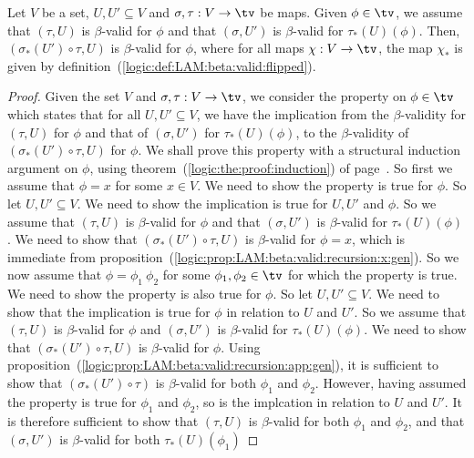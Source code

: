 \begin{prop}
    Let $V$ be a set, $U,U'\subseteq V$ and $\sigma,\tau:V\to\tv$ be maps.
    Given $\phi\in\tv$, we assume that $(\tau,U)$ is $\beta$-valid for $\phi$
    and that $(\sigma,U')$ is $\beta$-valid for $\tau_{*}(U)(\phi)$.
    Then, $(\sigma_{*}(U')\circ\tau,U)$ is $\beta$-valid for $\phi$,
    where for all maps $\chi:V\to\tv$, the map $\chi_{*}$ is given by
    definition~(\ref{logic:def:LAM:beta:valid:flipped}).
\end{prop}
\begin{proof}
    Given the set $V$ and $\sigma,\tau:V\to\tv$, we consider the property on 
    $\phi\in\tv$ which states that for all $U,U'\subseteq V$, we have the
    implication from the $\beta$-validity for $(\tau,U)$ for $\phi$ and 
    that of $(\sigma,U')$ for $\tau_{*}(U)(\phi)$, to the $\beta$-validity
    of $(\sigma_{*}(U')\circ\tau,U)$ for $\phi$. We shall prove this property
    with a structural induction argument on $\phi$, using
    theorem~(\ref{logic:the:proof:induction}) of 
    page~\pageref{logic:the:proof:induction}. So first we assume that $\phi=x$
    for some $x\in V$. We need to show the property is true for $\phi$. So
    let $U,U'\subseteq V$. We need to show the implication is true for $U,U'$
    and $\phi$. So we assume that $(\tau,U)$ is $\beta$-valid for $\phi$ and
    that $(\sigma,U')$ is $\beta$-valid for $\tau_{*}(U)(\phi)$. We need to 
    show that $(\sigma_{*}(U')\circ\tau,U)$ is $\beta$-valid for $\phi=x$,
    which is immediate from 
    proposition~(\ref{logic:prop:LAM:beta:valid:recursion:x:gen}). So we
    now assume that $\phi=\phi_{1}\ \phi_{2}$ for some $\phi_{1},\phi_{2}\in\tv$
    for which the property is true. We need to show the property is also true
    for $\phi$. So let $U,U'\subseteq V$. We need to show that the implication
    is true for $\phi$ in relation to $U$ and $U'$. So we assume that
    $(\tau,U)$ is $\beta$-valid for $\phi$ and $(\sigma,U')$ is $\beta$-valid
    for $\tau_{*}(U)(\phi)$. We need to show that $(\sigma_{*}(U')\circ\tau,U)$
    is $\beta$-valid for $\phi$. Using
    proposition~(\ref{logic:prop:LAM:beta:valid:recursion:app:gen}), it is
    sufficient to show that $(\sigma_{*}(U')\circ\tau)$ is $\beta$-valid
    for both $\phi_{1}$ and $\phi_{2}$. However, having assumed the property
    is true for $\phi_{1}$ and $\phi_{2}$, so is the implcation in relation
    to $U$ and $U'$. It is therefore sufficient to show that $(\tau,U)$ is
    $\beta$-valid for both $\phi_{1}$ and $\phi_{2}$, and that 
    $(\sigma,U')$ is $\beta$-valid for both $\tau_{*}(U)(\phi_{1})$

\end{proof}
